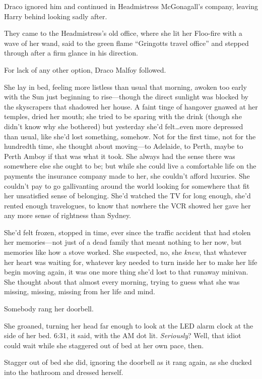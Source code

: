 Draco ignored him and continued in Headmistress McGonagall’s company, leaving Harry behind looking sadly after.

They came to the Headmistress’s old office, where she lit her Floo-fire with a wave of her wand, said to the green flame “Gringotts travel office” and stepped through after a firm glance in his direction.

For lack of any other option, Draco Malfoy followed.

\later

She lay in bed, feeling more listless than usual that morning, awoken too early with the Sun just beginning to rise—though the direct sunlight was blocked by the skyscrapers that shadowed her house. A faint tinge of hangover gnawed at her temples, dried her mouth; she tried to be sparing with the drink (though she didn’t know why she bothered) but yesterday she’d felt…even more depressed than usual, like she’d lost something, somehow. Not for the first time, not for the hundredth time, she thought about moving—to Adelaide, to Perth, maybe to Perth Amboy if that was what it took. She always had the sense there was somewhere else she ought to be; but while she could live a comfortable life on the payments the insurance company made to her, she couldn’t afford luxuries. She couldn’t pay to go gallivanting around the world looking for somewhere that fit her unsatisfied sense of belonging. She’d watched the TV for long enough, she’d rented enough travelogues, to know that nowhere the VCR showed her gave her any more sense of rightness than Sydney.

She’d felt frozen, stopped in time, ever since the traffic accident that had stolen her memories—not just of a dead family that meant nothing to her now, but memories like how a stove worked. She suspected, no, she \emph{knew}, that whatever her heart was waiting for, whatever key needed to turn inside her to make her life begin moving again, it was one more thing she’d lost to that runaway minivan. She thought about that almost every morning, trying to guess what she was missing, missing, missing from her life and mind.

Somebody rang her doorbell.

She groaned, turning her head far enough to look at the LED alarm clock at the side of her bed. 6:31, it said, with the AM dot lit. \emph{Seriously}? Well, that idiot could wait while she staggered out of bed at her own pace, then.

Stagger out of bed she did, ignoring the doorbell as it rang again, as she ducked into the bathroom and dressed herself.

